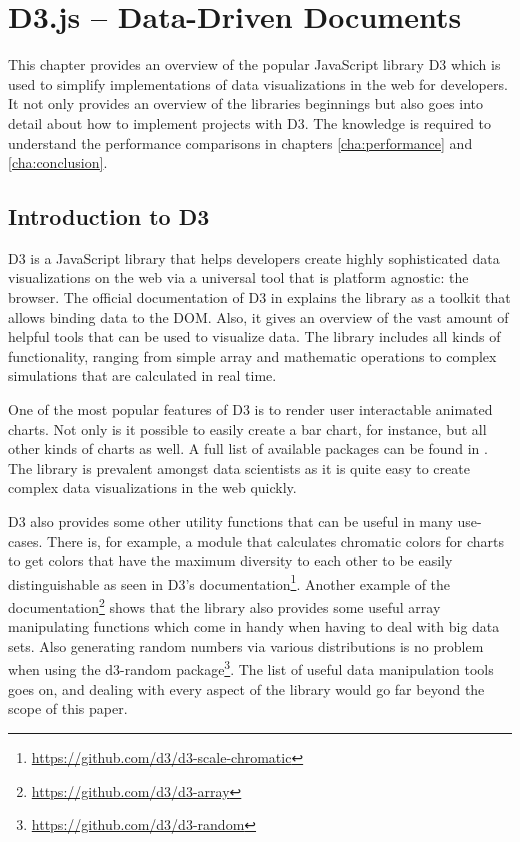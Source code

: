 \chapter{D3.js – Data-Driven Documents}
\label{cha:d3js}

This chapter provides an overview of the popular JavaScript library D3 \cite{D3Website} which is used to simplify implementations of data visualizations in the web for developers. It not only provides an overview of the libraries beginnings but also goes into detail about how to implement projects with D3. The knowledge is required to understand the performance comparisons in chapters \ref{cha:performance} and \ref{cha:conclusion}.


\section{Introduction to D3}

D3 is a JavaScript library that helps developers create highly sophisticated data visualizations on the web via a universal tool that is platform agnostic: the browser. The official documentation of D3 in \cite{D3Website} explains the library as a toolkit that allows binding data to the DOM. Also, it gives an overview of the vast amount of helpful tools that can be used to visualize data. The library includes all kinds of functionality, ranging from simple array and mathematic operations to complex simulations that are calculated in real time.

One of the most popular features of D3 is to render user interactable animated charts. Not only is it possible to easily create a bar chart, for instance, but all other kinds of charts as well. A full list of available packages can be found in \cite{D3Github}. The library is prevalent amongst data scientists as it is quite easy to create complex data visualizations in the web quickly.

D3 also provides some other utility functions that can be useful in many use-cases. There is, for example, a module that calculates chromatic colors for charts to get colors that have the maximum diversity to each other to be easily distinguishable as seen in D3's documentation\footnote{\url{https://github.com/d3/d3-scale-chromatic}}. Another example of the documentation\footnote{\url{https://github.com/d3/d3-array}} shows that the library also provides some useful array manipulating functions which come in handy when having to deal with big data sets. Also generating random numbers via various distributions is no problem when using the d3-random package\footnote{\url{https://github.com/d3/d3-random}}. The list of useful data manipulation tools goes on, and dealing with every aspect of the library would go far beyond the scope of this paper. 


